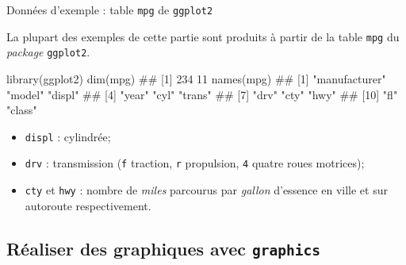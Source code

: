 \documentclass[12pt,handout,ignorenonframetext,]{beamer}
\newenvironment{Shaded}{}{}
\newcommand{\KeywordTok}[1]{\textcolor[rgb]{0.00,0.00,1.00}{{#1}}}
\newcommand{\NormalTok}[1]{{#1}}
\providecommand{\tightlist}{%
\setlength{\itemsep}{0pt}\setlength{\parskip}{0pt}}
\renewenvironment{Shaded}{\begin{snugshade}}{\end{snugshade}}
\begin{document}
\begin{frame}[fragile]{Données d'exemple : table \texttt{mpg} de
\texttt{ggplot2}}

\small

La plupart des exemples de cette partie sont produits à partir de la
table \texttt{mpg} du \emph{package} \texttt{ggplot2}.

\footnotesize

\begin{Shaded}
\begin{Highlighting}[]
\KeywordTok{library}\NormalTok{(ggplot2)}
\KeywordTok{dim}\NormalTok{(mpg)}
  \NormalTok{## [1] 234  11}
\KeywordTok{names}\NormalTok{(mpg)}
  \NormalTok{##  [1] "manufacturer" "model"        "displ"       }
  \NormalTok{##  [4] "year"         "cyl"          "trans"       }
  \NormalTok{##  [7] "drv"          "cty"          "hwy"         }
  \NormalTok{## [10] "fl"           "class"}
\end{Highlighting}
\end{Shaded}

\pause \vspace{-0.4cm} \small

\begin{itemize}
\tightlist
\item
  \texttt{displ} : cylindrée;
\item
  \texttt{drv} : transmission (\texttt{f} traction, \texttt{r}
  propulsion, \texttt{4} quatre roues motrices);
\item
  \texttt{cty} et \texttt{hwy} : nombre de \emph{miles} parcourus par
  \emph{gallon} d'essence en ville et sur autoroute respectivement.
\end{itemize}

\end{frame}

\subsection{\texorpdfstring{Réaliser des graphiques avec
\texttt{graphics}}{Réaliser des graphiques avec graphics}}\label{realiser-des-graphiques-avec-graphics}
\end{document}
